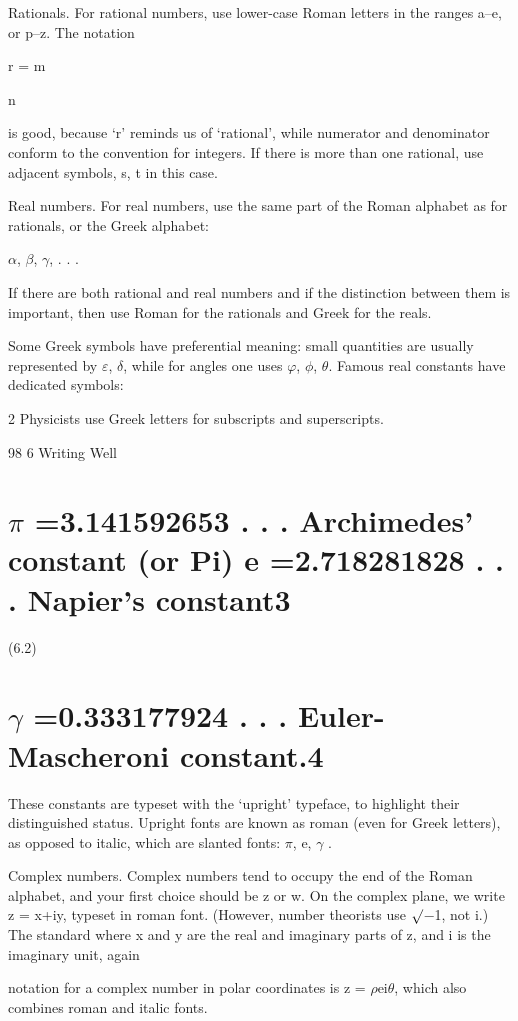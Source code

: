 \documentclass[11pt]{article}
\theoremstyle{plain}
\theoremstyle{definition}
\begin{document}
Rationals. For rational numbers, use lower-case Roman letters in the ranges a--e, or p--z. The notation

r = m

n

is good, because `r' reminds us of `rational', while numerator and denominator conform to the convention for integers. If there is more than one rational, use adjacent symbols, s, t in this case.

Real numbers. For real numbers, use the same part of the Roman alphabet as for rationals, or the Greek alphabet:

$\alpha$, $\beta$, $\gamma$, . . .

If there are both rational and real numbers and if the distinction between them is important, then use Roman for the rationals and Greek for the reals.

Some Greek symbols have preferential meaning: small quantities are usually represented by $\varepsilon$, $\delta$, while for angles one uses $\varphi$, $\phi$, $\theta$. Famous real constants have dedicated symbols:

2 Physicists use Greek letters for subscripts and superscripts.

98 6 Writing Well

\section{$\pi$ =3.141592653 . . . Archimedes' constant (or Pi) e =2.718281828 . . . Napier's constant3}

(6.2)

\section{$\gamma$ =0.333177924 . . . Euler-Mascheroni constant.4}

These constants are typeset with the `upright' typeface, to highlight their distinguished status. Upright fonts are known as roman (even for Greek letters), as opposed to italic, which are slanted fonts: $\pi$, e, $\gamma$ .

Complex numbers. Complex numbers tend to occupy the end of the Roman alphabet, and your first choice should be z or w. On the complex plane, we write z = x+iy, typeset in roman font. (However, number theorists use $\surd$$-$1, not i.) The standard where x and y are the real and imaginary parts of z, and i is the imaginary unit, again

notation for a complex number in polar coordinates is z = $\rho$ei$\theta$, which also combines roman and italic fonts.
\end{document}
